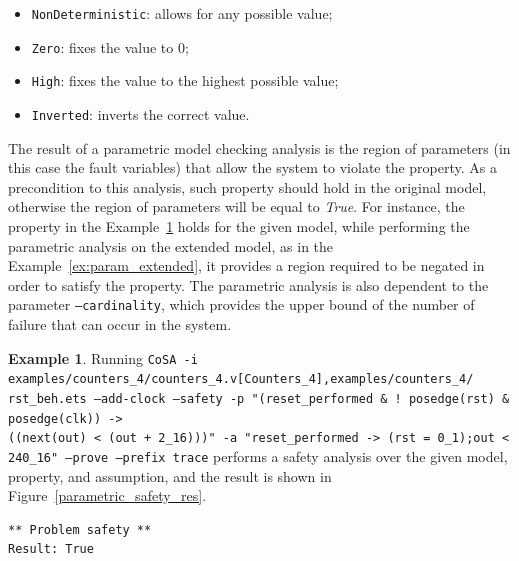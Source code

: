 \documentclass{article}
\theoremstyle{definition}
\newtheorem{example}{Example}[section]
\begin{document}
\begin{itemize}
\item \texttt{NonDeterministic}: allows for any possible value;
\item \texttt{Zero}: fixes the value to 0;
\item \texttt{High}: fixes the value to the highest possible value;
\item \texttt{Inverted}: inverts the correct value.
\end{itemize}

The result of a parametric model checking analysis is the region of
parameters (in this case the fault variables) that allow the system to
violate the property. As a precondition to this analysis, such
property should hold in the original model, otherwise the region of
parameters will be equal to \emph{True}. For instance, the property in
the Example~\ref{ex:param_nominal} holds for the given model, while
performing the parametric analysis on the extended model, as in the
Example~\ref{ex:param_extended}, it provides a region required to be
negated in order to satisfy the property. The parametric analysis is
also dependent to the parameter \texttt{--cardinality}, which provides
the upper bound of the number of failure that can occur in the system.

\begin{example}
  \label{ex:param_nominal}
  Running \texttt{CoSA -i
    examples/counters\_4/counters\_4.v[Counters\_4],examples/counters\_4/
    rst\_beh.ets
    --add-clock --safety -p "(reset\_performed \& ! posedge(rst) \&
    posedge(clk)) -> \\((next(out) < (out + 2\_16)))" -a
    "reset\_performed -> (rst = 0\_1);out < 240\_16" --prove --prefix trace}
  performs a safety analysis over the given model, property, and
  assumption, and the result is shown in Figure~\ref{parametric_safety_res}.

\begin{lstlisting}[frame=single,language=ets,caption=Safety analysis example,label=parametric_safety_res]
** Problem safety **
Result: True
\end{lstlisting}

\end{example}
\end{document}
